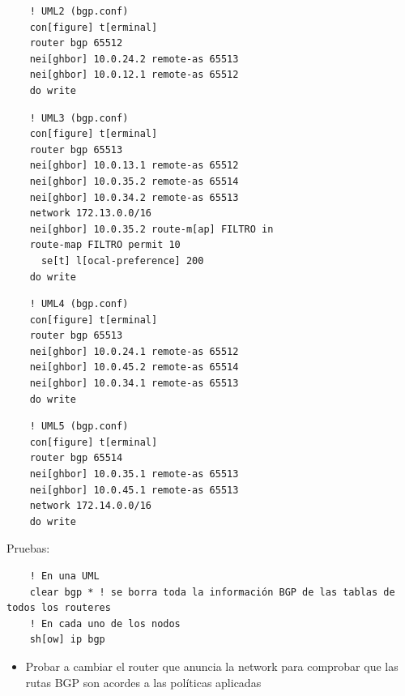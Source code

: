 \documentclass{article}
\begin{document}
  \begin{verbatim}
    ! UML2 (bgp.conf)
    con[figure] t[erminal]
    router bgp 65512
    nei[ghbor] 10.0.24.2 remote-as 65513
    nei[ghbor] 10.0.12.1 remote-as 65512
    do write
  \end{verbatim}

  \begin{verbatim}
    ! UML3 (bgp.conf)
    con[figure] t[erminal]
    router bgp 65513
    nei[ghbor] 10.0.13.1 remote-as 65512
    nei[ghbor] 10.0.35.2 remote-as 65514
    nei[ghbor] 10.0.34.2 remote-as 65513
    network 172.13.0.0/16
    nei[ghbor] 10.0.35.2 route-m[ap] FILTRO in
    route-map FILTRO permit 10
      se[t] l[ocal-preference] 200
    do write
  \end{verbatim}

  \begin{verbatim}
    ! UML4 (bgp.conf)
    con[figure] t[erminal]
    router bgp 65513
    nei[ghbor] 10.0.24.1 remote-as 65512
    nei[ghbor] 10.0.45.2 remote-as 65514
    nei[ghbor] 10.0.34.1 remote-as 65513
    do write
  \end{verbatim}

  \begin{verbatim}
    ! UML5 (bgp.conf)
    con[figure] t[erminal]
    router bgp 65514
    nei[ghbor] 10.0.35.1 remote-as 65513
    nei[ghbor] 10.0.45.1 remote-as 65513
    network 172.14.0.0/16
    do write
  \end{verbatim}

  Pruebas:
  \begin{verbatim}
    ! En una UML
    clear bgp * ! se borra toda la información BGP de las tablas de todos los routeres
    ! En cada uno de los nodos
    sh[ow] ip bgp
  \end{verbatim}

  \begin{itemize}
    \item Probar a cambiar el router que anuncia la network para comprobar
    que las rutas BGP son acordes a las políticas aplicadas
  \end{itemize}
\end{document}
